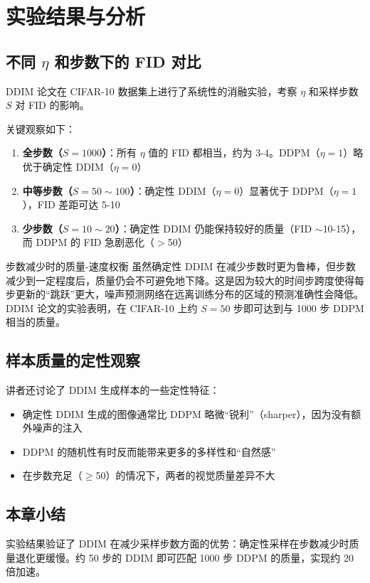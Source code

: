 \section{实验结果与分析}

\subsection{不同 $\eta$ 和步数下的 FID 对比}

DDIM 论文在 CIFAR-10 数据集上进行了系统性的消融实验，考察 $\eta$ 和采样步数 $S$ 对 FID 的影响。

关键观察如下：

\begin{enumerate}
    \item \textbf{全步数（$S=1000$）}：所有 $\eta$ 值的 FID 都相当，约为 3-4。DDPM（$\eta=1$）略优于确定性 DDIM（$\eta=0$）
    \item \textbf{中等步数（$S=50\sim100$）}：确定性 DDIM（$\eta=0$）显著优于 DDPM（$\eta=1$），FID 差距可达 5-10
    \item \textbf{少步数（$S=10\sim20$）}：确定性 DDIM 仍能保持较好的质量（FID $\sim$10-15），而 DDPM 的 FID 急剧恶化（$>$50）
\end{enumerate}

\begin{warningbox}{步数减少时的质量-速度权衡}
虽然确定性 DDIM 在减少步数时更为鲁棒，但步数减少到一定程度后，质量仍会不可避免地下降。这是因为较大的时间步跨度使得每步更新的``跳跃''更大，噪声预测网络在远离训练分布的区域的预测准确性会降低。DDIM 论文的实验表明，在 CIFAR-10 上约 $S=50$ 步即可达到与 1000 步 DDPM 相当的质量。
\end{warningbox}

\subsection{样本质量的定性观察}

讲者还讨论了 DDIM 生成样本的一些定性特征：

\begin{itemize}
    \item 确定性 DDIM 生成的图像通常比 DDPM 略微``锐利''（sharper），因为没有额外噪声的注入
    \item DDPM 的随机性有时反而能带来更多的多样性和``自然感''
    \item 在步数充足（$\geq$50）的情况下，两者的视觉质量差异不大
\end{itemize}

\subsection{本章小结}

实验结果验证了 DDIM 在减少采样步数方面的优势：确定性采样在步数减少时质量退化更缓慢。约 50 步的 DDIM 即可匹配 1000 步 DDPM 的质量，实现约 20 倍加速。


